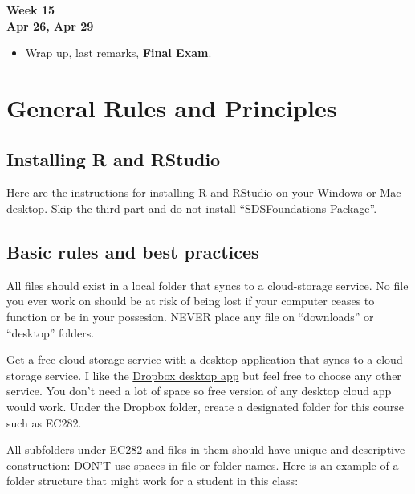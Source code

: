 \documentclass[
]{book}
\providecommand{\tightlist}{%
  \setlength{\itemsep}{0pt}\setlength{\parskip}{0pt}}
\begin{document}
\textbf{Week 15}\\
\textbf{Apr 26, Apr 29}

\begin{itemize}
\tightlist
\item
  Wrap up, last remarks, \textbf{Final Exam}.
\end{itemize}

\hypertarget{general-rules-and-principles}{%
\chapter{General Rules and Principles}\label{general-rules-and-principles}}

\hypertarget{installing-r-and-rstudio}{%
\section{Installing R and RStudio}\label{installing-r-and-rstudio}}

Here are the \href{https://courses.edx.org/courses/UTAustinX/UT.7.01x/3T2014/56c5437b88fa43cf828bff5371c6a924/}{instructions} for installing R and RStudio on your Windows or Mac desktop. Skip the third part and do not install ``SDSFoundations Package''.

\hypertarget{basic-rules-and-best-practices}{%
\section{Basic rules and best practices}\label{basic-rules-and-best-practices}}

All files should exist in a local folder that syncs to a cloud-storage service. No file you ever work on should be at risk of being lost if your computer ceases to function or be in your possesion. NEVER place any file on ``downloads'' or ``desktop'' folders.

Get a free cloud-storage service with a desktop application that syncs to a cloud-storage service. I like the \href{https://help.dropbox.com/installs-integrations/desktop/desktop-application-overview}{Dropbox desktop app} but feel free to choose any other service. You don't need a lot of space so free version of any desktop cloud app would work. Under the Dropbox folder, create a designated folder for this course such as EC282.

All subfolders under EC282 and files in them should have unique and descriptive construction: DON'T use spaces in file or folder names. Here is an example of a folder structure that might work for a student in this class:
\end{document}
